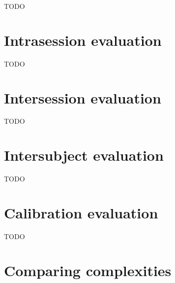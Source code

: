 
TODO


\section{Intrasession evaluation}
\label{sec:evaluation_intrasession}


TODO

\section{Intersession evaluation}
\label{sec:evaluation_intersession}


TODO

\section{Intersubject evaluation}
\label{sec:evaluation_intersubject}


TODO

\section{Calibration evaluation}
\label{sec:evaluation_calibration}


TODO

\section{Comparing complexities}
\label{sec:evaluation_complexities}

